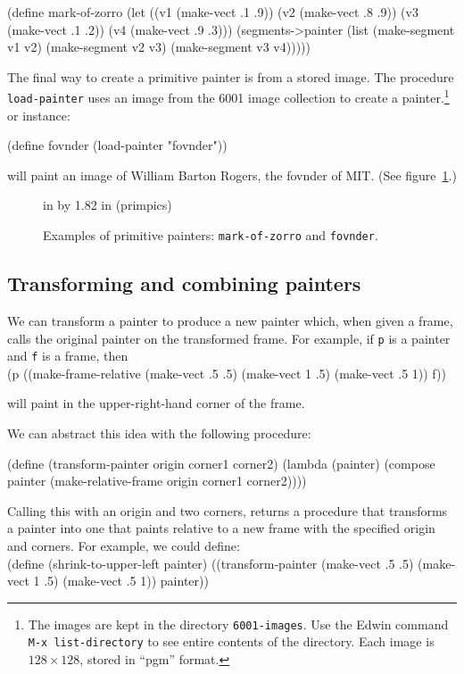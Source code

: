 \beginlisp
(define mark-of-zorro
  (let ((v1 (make-vect .1 .9))
        (v2 (make-vect .8 .9))
        (v3 (make-vect .1 .2))
        (v4 (make-vect .9 .3)))
    (segments->painter
     (list (make-segment v1 v2)
           (make-segment v2 v3)
           (make-segment v3 v4)))))
\endlisp

The final way to create a primitive painter is from a stored image.
The procedure {\tt load-painter} uses an image from the 6001 image
collection to create a painter.\footnote{The images are kept in the
directory {\tt 6001-images}.  Use the Edwin command
{\tt M-x list-directory} to see entire contents of the directory.
Each image is $128\times 128$, stored in ``pgm'' format.}
or instance:

\beginlisp
(define fovnder (load-painter "fovnder"))
\endlisp

\noindent
will paint an image of William Barton Rogers, the {\sc fovnder} of MIT.
(See figure~\ref{primitive-painters}.)

\begin{figure}
 in by 1.82 in (primpics)
\caption{{\protect\footnotesize
Examples of primitive painters: {\tt mark-of-zorro} and {\tt fovnder}.}}
\label{primitive-painters}
\end{figure}

\subsection{Transforming and combining painters}

We can transform a painter to produce a new painter which, when
given a frame, calls the original painter on the transformed frame.
For example, if {\tt p} is a painter and {\tt f} is a frame, then\\
\beginlisp
(p ((make-frame-relative (make-vect .5 .5) (make-vect 1 .5) (make-vect .5 1))
    f))
\endlisp

\noindent
will paint in the upper-right-hand corner of the frame.

We can abstract this idea with the following procedure:

\beginlisp
(define (transform-painter origin corner1 corner2)
  (lambda (painter)
    (compose painter
             (make-relative-frame origin corner1 corner2))))
\endlisp

\noindent
Calling this with an origin and two corners, returns a procedure that
transforms a painter into one that paints relative to a new frame with
the specified origin and corners.  For example, we could define:\\
\beginlisp
(define (shrink-to-upper-left painter)
  ((transform-painter (make-vect .5 .5) (make-vect 1 .5) (make-vect .5 1))
   painter))
\endlisp

